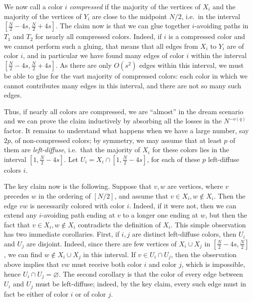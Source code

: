 \documentclass[11pt,reqno]{amsart}
\theoremstyle{definition}
\newcommand\1{\mathbf{1}}
\begin{document}
We now call a color $i$ \emph{compressed} if the majority of the vertices of $X_i$ and the majority of the vertices of $Y_i$ are close to the midpoint $N/2$, i.e.\ in the interval $[\frac N2 - 4s, \frac N2 + 4s]$. The claim now is that we can glue together $i$-avoiding paths in $T_1$ and $T_2$ for nearly all compressed colors. Indeed, if $i$ is a compressed color and we cannot perform such a gluing, that means that all edges from $X_i$ to $Y_i$ are of color $i$, and in particular we have found many edges of color $i$ within the interval $[\frac N2 - 4s, \frac N2 + 4s]$. As there are only $O(s^2)$ edges within this interval, we must be able to glue for the vast majority of compressed colors: each color in which we cannot contributes many edges in this interval, and there are not so many such edges.

Thus, if nearly all colors are compressed, we are ``almost'' in the dream scenario and we can prove the claim inductively by absorbing all the losses in the $N^{-o(q)}$ factor. It remains to understand what happens when we have a large number, say $2p$, of non-compressed colors; by symmetry, we may assume that at least $p$ of them are \emph{left-diffuse}, i.e.\ that the majority of $X_i$ for these colors lies in the interval $[1,\frac N2-4s]$. Let $U_i =X_i \cap [1, \frac N2-4s]$, for each of these $p$ left-diffuse colors $i$.

The key claim now is the following. Suppose that $v,w$ are vertices, where $v$ precedes $w$ in the ordering of $[N/2]$, and assume that $v \in X_i, w \notin X_i$. Then the edge $vw$ is necessarily colored with color $i$. Indeed, if it were not, then we can extend any $i$-avoiding path ending at $v$ to a longer one ending at $w$, but then the fact that $v \in X_i,w\notin X_i$ contradicts the definition of $X_i$. This simple observation has two immediate corollaries. First, if $i,j$ are distinct left-diffuse colors, then $U_i$ and $U_j$ are disjoint. Indeed, since there are few vertices of $X_i \cup X_j$ in $[\frac N2-4s,\frac N2]$, we can find $w\notin X_i \cup X_j$ in this interval. If $v \in U_i \cap U_j$, then the observation above implies that $vw$ must receive both color $i$ and color $j$, which is impossible, hence $U_i \cap U_j=\varnothing$. The second corollary is that the color of every edge between $U_i$ and $U_j$ must be left-diffuse; indeed, by the key claim, every such edge must in fact be either of color $i$ or of color $j$.
\end{document}
